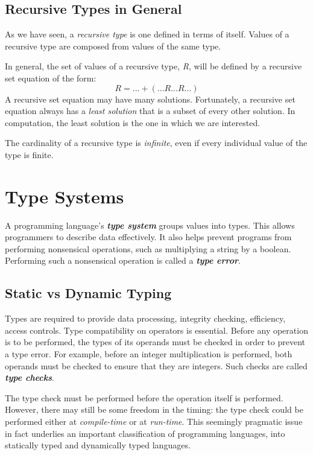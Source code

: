 \documentclass{article}
\begin{document}
\subsection{Recursive Types in General}

As we have seen, a \textit{recursive type} is one defined in terms of itself. Values of a recursive type are composed from values of the same type.

In general, the set of values of a recursive type, \textit{R}, will be defined by a recursive set equation of the form:
\begin{equation}
    R = ... + (...R...R...)
\end{equation}
A recursive set equation may have many solutions. Fortunately, a recursive set equation always has a \textit{least solution} that is a subset of every other solution. In computation, the least solution is the one in which we are interested.

The cardinality of a recursive type is \textit{infinite}, even if every individual value of the type is finite.


\section{Type Systems}

A programming language’s \textbf{\textit{type system}} groups values into types. This allows programmers to describe data effectively. It also helps prevent programs from performing nonsensical operations, such as multiplying a string by a boolean. Performing such a nonsensical operation is called a \textbf{\textit{type error}}.

\subsection{Static vs Dynamic Typing}

Types are required to provide data processing, integrity checking, efficiency, access controls. Type compatibility on operators is essential. Before any operation is to be performed, the types of its operands must be checked in order to prevent a type error. For example, before an integer multiplication is performed, both operands must be checked to ensure that they are integers.  Such checks are called \textbf{\textit{type checks}}.

The type check must be performed before the operation itself is performed. However, there may still be some freedom in the timing: the type check could be performed either at \textit{compile-time} or at \textit{run-time}. This seemingly pragmatic issue in fact underlies an important classification of programming languages, into statically typed and dynamically typed languages.
\end{document}
